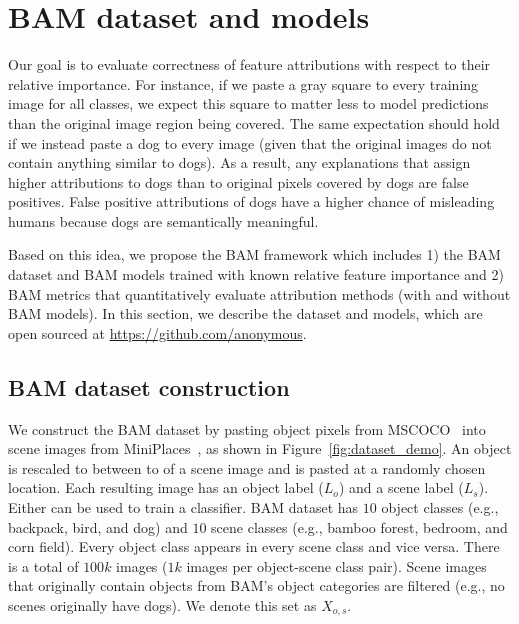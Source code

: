 \documentclass[twoside]{article}
\begin{document}
\section{BAM dataset and models}
\label{sec:dataset}
Our goal is to evaluate correctness of feature attributions with respect to their relative importance. For instance, if we paste a gray square to every training image for all classes, we expect this square to matter less to model predictions than the original image region being covered. The same expectation should hold if we instead paste a dog to every image (given that the original images do not contain anything similar to dogs). As a result, any explanations that assign higher attributions to dogs than to original pixels covered by dogs are false positives. False positive attributions of dogs have a higher chance of misleading humans because dogs are semantically meaningful. 

Based on this idea, we propose the BAM framework which includes 1) the BAM dataset and BAM models trained with known relative feature importance and 2) BAM metrics that quantitatively evaluate attribution methods (with and without BAM models). In this section, we describe the dataset and models, which are open sourced at \url{https://github.com/anonymous}.

\subsection{BAM dataset construction}
We construct the BAM dataset by pasting object pixels from MSCOCO~\citep{Lin14} into scene images from MiniPlaces~\citep{Zhou17}, as shown in Figure~\ref{fig:dataset_demo}. An object is rescaled to between  to  of a scene image and is pasted at a randomly chosen location. Each resulting image has an object label ($L_o$) and a scene label ($L_s$). Either can be used to train a classifier. BAM dataset has $10$ object classes (e.g., backpack, bird, and dog) and $10$ scene classes (e.g., bamboo forest, bedroom, and corn field). Every object class appears in every scene class and vice versa. There is a total of $100k$ images ($1k$ images per object-scene class pair). Scene images that originally contain objects from BAM's object categories are filtered (e.g., no scenes originally have dogs). We denote this set as $X_{o,s}$.
\end{document}
